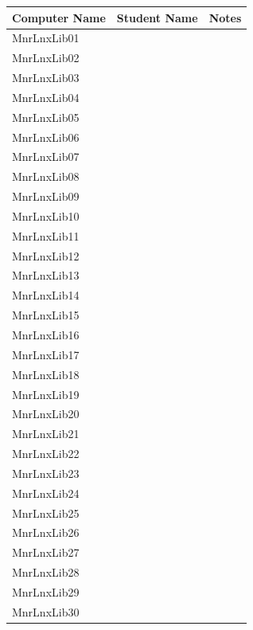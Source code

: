 \begin{tabular}{|l|p{7cm}|p{5cm}|}
        \hline
        \textbf{Computer Name} & \textbf{Student Name} & \textbf{Notes}\\ \hline
        MnrLnxLib01 & & \\ \hline
        MnrLnxLib02 & & \\ \hline
        MnrLnxLib03 & & \\ \hline
        MnrLnxLib04 & & \\ \hline
        MnrLnxLib05 & & \\ \hline
        MnrLnxLib06 & & \\ \hline
        MnrLnxLib07 & & \\ \hline
        MnrLnxLib08 & & \\ \hline
        MnrLnxLib09 & & \\ \hline
        MnrLnxLib10 & & \\ \hline
        MnrLnxLib11 & & \\ \hline
        MnrLnxLib12 & & \\ \hline
        MnrLnxLib13 & & \\ \hline
        MnrLnxLib14 & & \\ \hline
        MnrLnxLib15 & & \\ \hline
        MnrLnxLib16 & & \\ \hline
        MnrLnxLib17 & & \\ \hline
        MnrLnxLib18 & & \\ \hline
        MnrLnxLib19 & & \\ \hline
        MnrLnxLib20 & & \\ \hline
        MnrLnxLib21 & & \\ \hline
        MnrLnxLib22 & & \\ \hline
        MnrLnxLib23 & & \\ \hline
        MnrLnxLib24 & & \\ \hline
        MnrLnxLib25 & & \\ \hline
        MnrLnxLib26 & & \\ \hline
        MnrLnxLib27 & & \\ \hline
        MnrLnxLib28 & & \\ \hline
        MnrLnxLib29 & & \\ \hline
        MnrLnxLib30 & & \\ \hline
\end{tabular}
